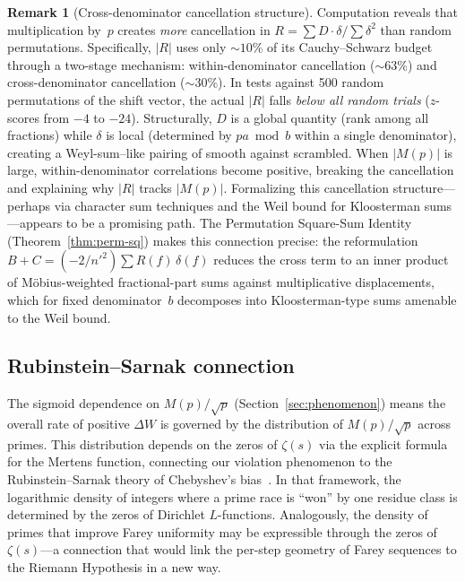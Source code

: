 \documentclass[11pt]{article}
\theoremstyle{definition}
\newtheorem{remark}[theorem]{Remark}
\begin{document}
\begin{remark}[Cross-denominator cancellation structure]
\label{rem:R-cancel}
Computation reveals that multiplication by~$p$ creates
\emph{more} cancellation in $R = \sum D \cdot \delta / \sum \delta^2$
than random permutations.  Specifically, $|R|$ uses only
${\sim}10\%$ of its Cauchy--Schwarz budget through a two-stage
mechanism: within-denominator cancellation (${\sim}63\%$)
and cross-denominator cancellation (${\sim}30\%$).  In tests
against 500 random permutations of the shift vector, the
actual $|R|$ falls \emph{below all random trials} ($z$-scores
from $-4$ to $-24$).  Structurally, $D$ is a global quantity
(rank among all fractions) while $\delta$ is local (determined
by $pa \bmod b$ within a single denominator), creating a
Weyl-sum--like pairing of smooth against scrambled.  When
$|M(p)|$ is large, within-denominator correlations become
positive, breaking the cancellation and explaining why
$|R|$ tracks $|M(p)|$.  Formalizing this cancellation
structure---perhaps via character sum techniques and the
Weil bound for Kloosterman sums---appears to be a
promising path.
The Permutation Square-Sum Identity
(Theorem~\ref{thm:perm-sq}) makes this connection
precise: the reformulation $B + C = (-2/{n'}^2)\sum R(f)\,\delta(f)$
reduces the cross term to an inner product of
M\"obius-weighted fractional-part sums against
multiplicative displacements, which for fixed denominator~$b$
decomposes into Kloosterman-type sums amenable to the
Weil bound.
\end{remark}

\subsection{Rubinstein--Sarnak connection}

The sigmoid dependence on $M(p)/\sqrt{p}$ (Section~\ref{sec:phenomenon})
means the overall rate of positive $\Delta W$ is governed by the distribution
of $M(p)/\sqrt{p}$ across primes.  This distribution depends on
the zeros of $\zeta(s)$ via the explicit formula for the Mertens
function, connecting our violation phenomenon to the
Rubinstein--Sarnak theory of Chebyshev's
bias~\cite{RubinsteinSarnak1994}.  In that framework, the
logarithmic density of integers where a prime race is ``won'' by
one residue class is determined by the zeros of Dirichlet
$L$-functions.  Analogously, the density of primes that
improve Farey uniformity may be expressible through the zeros
of~$\zeta(s)$---a connection that would link the per-step
geometry of Farey sequences to the Riemann Hypothesis in a
new way.
\end{document}
